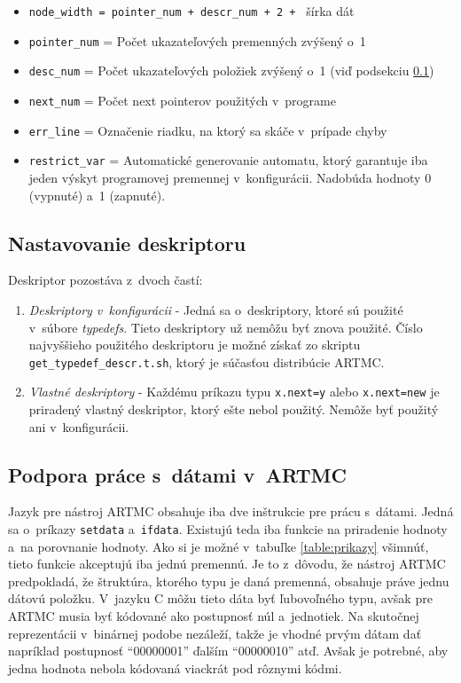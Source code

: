 \begin{itemize}
\item \texttt{node\_width = pointer\_num + descr\_num + 2 + } šírka dát  
\item \texttt{pointer\_num} = Počet ukazateľových premenných zvýšený o~1
\item \texttt{desc\_num} = Počet ukazateľových položiek zvýšený o~1 (viď podsekciu \ref{kap_descr})
\item \texttt{next\_num} = Počet next pointerov použitých v~programe
\item \texttt{err\_line} = Označenie riadku, na ktorý sa skáče v~prípade chyby
\item \texttt{restrict\_var} = Automatické generovanie automatu, ktorý garantuje iba jeden výskyt programovej premennej v~konfigurácii. Nadobúda hodnoty 0 (vypnuté) a~1 (zapnuté).
\end{itemize}


\subsection{Nastavovanie deskriptoru}
\label{kap_descr}
Deskriptor pozostáva z~dvoch častí:
\begin{enumerate}
\item \textit{Deskriptory v~konfigurácii} - Jedná sa o~deskriptory, ktoré sú použité v~súbore \textit{typedefs}. Tieto deskriptory už nemôžu byť znova použité. Číslo najvyššieho použitého deskriptoru je možné získať zo skriptu \texttt{get\_typedef\_descr.t.sh}, ktorý je súčasťou distribúcie ARTMC.
\item \textit{Vlastné deskriptory} - Každému príkazu typu \texttt{x.next=y} alebo \texttt{x.next=new} je priradený vlastný deskriptor, ktorý ešte nebol použitý. Nemôže byť použitý ani v~konfigurácii.
\end{enumerate}

\subsection{Podpora práce s~dátami v~ARTMC}
Jazyk pre nástroj ARTMC obsahuje iba dve inštrukcie pre prácu s~dátami. Jedná sa o~príkazy \texttt{setdata} a~\texttt{ifdata}. Existujú teda iba funkcie na priradenie hodnoty a~na porovnanie hodnoty. Ako si je možné v~tabuľke \ref{table:prikazy} všimnúť, tieto funkcie akceptujú iba jednú premennú. Je to z~dôvodu, že nástroj ARTMC predpokladá, že štruktúra, ktorého typu je daná premenná, obsahuje práve jednu dátovú položku. V~jazyku C môžu tieto dáta byť ľubovoľného typu, avšak pre ARTMC musia byť kódované ako postupnosť núl a~jednotiek. Na skutočnej reprezentácii v~binárnej podobe nezáleží, takže je vhodné prvým dátam dať napríklad postupnosť ``00000001'' ďalším ``00000010'' atď. Avšak je potrebné, aby jedna hodnota nebola kódovaná viackrát pod rôznymi kódmi.


